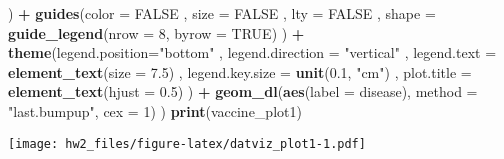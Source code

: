 \documentclass[]{article}
\newenvironment{Shaded}{\begin{snugshade}}{\end{snugshade}}
\newcommand{\DataTypeTok}[1]{\textcolor[rgb]{0.13,0.29,0.53}{#1}}
\newcommand{\DecValTok}[1]{\textcolor[rgb]{0.00,0.00,0.81}{#1}}
\newcommand{\FloatTok}[1]{\textcolor[rgb]{0.00,0.00,0.81}{#1}}
\newcommand{\KeywordTok}[1]{\textcolor[rgb]{0.13,0.29,0.53}{\textbf{#1}}}
\newcommand{\NormalTok}[1]{#1}
\newcommand{\OperatorTok}[1]{\textcolor[rgb]{0.81,0.36,0.00}{\textbf{#1}}}
\newcommand{\OtherTok}[1]{\textcolor[rgb]{0.56,0.35,0.01}{#1}}
\newcommand{\StringTok}[1]{\textcolor[rgb]{0.31,0.60,0.02}{#1}}
\begin{document}
\begin{Shaded}
\begin{Highlighting}[]
\NormalTok{    )}
    \OperatorTok{+}\StringTok{ }\KeywordTok{guides}\NormalTok{(}\DataTypeTok{color =} \OtherTok{FALSE}
\NormalTok{        , }\DataTypeTok{size =} \OtherTok{FALSE}
\NormalTok{        , }\DataTypeTok{lty =} \OtherTok{FALSE}
\NormalTok{        , }\DataTypeTok{shape =} \KeywordTok{guide_legend}\NormalTok{(}\DataTypeTok{nrow =} \DecValTok{8}\NormalTok{, }\DataTypeTok{byrow =} \OtherTok{TRUE}\NormalTok{)}
\NormalTok{    )}
    \OperatorTok{+}\StringTok{ }\KeywordTok{theme}\NormalTok{(}\DataTypeTok{legend.position=}\StringTok{"bottom"}
\NormalTok{        , }\DataTypeTok{legend.direction =} \StringTok{"vertical"}
\NormalTok{        , }\DataTypeTok{legend.text =} \KeywordTok{element_text}\NormalTok{(}\DataTypeTok{size =} \FloatTok{7.5}\NormalTok{)}
\NormalTok{        , }\DataTypeTok{legend.key.size =} \KeywordTok{unit}\NormalTok{(}\FloatTok{0.1}\NormalTok{, }\StringTok{"cm"}\NormalTok{)}
\NormalTok{        , }\DataTypeTok{plot.title =} \KeywordTok{element_text}\NormalTok{(}\DataTypeTok{hjust =} \FloatTok{0.5}\NormalTok{)}
\NormalTok{    )}
    \OperatorTok{+}\StringTok{ }\KeywordTok{geom_dl}\NormalTok{(}\KeywordTok{aes}\NormalTok{(}\DataTypeTok{label =}\NormalTok{ disease), }\DataTypeTok{method =} \StringTok{"last.bumpup"}\NormalTok{, }\DataTypeTok{cex =} \DecValTok{1}\NormalTok{)}
\NormalTok{)}
\KeywordTok{print}\NormalTok{(vaccine_plot1)}
\end{Highlighting}
\end{Shaded}

\texttt{[image: hw2\_files/figure-latex/datviz\_plot1-1.pdf]}
\end{document}

